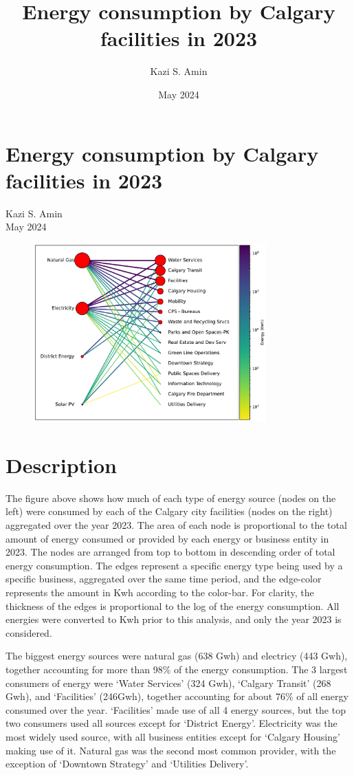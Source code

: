 \documentclass{article}
\title{Energy consumption by Calgary facilities in 2023}
\author{Kazi S. Amin}
\date{May 2024}
\begin{document}
{\centering\section*{Energy consumption by Calgary facilities in 2023}
Kazi S. Amin\\
May 2024\\
}
\begin{figure}
    \centering
    \includegraphics[width=0.8\textwidth]{Data_Analytics_Summer_Position/graph.pdf}
    \label{fig:enter-label}
\end{figure}

\FloatBarrier
\section*{Description}

The figure above shows how much of each type of energy source (nodes on the left) were consumed by each of the Calgary city facilities (nodes on the right) aggregated over the year 2023. The area of each node is proportional to the total amount of energy consumed or provided by each energy or business entity in 2023. The nodes are arranged from top to bottom in descending order of total energy consumption. The edges represent a specific energy type being used by a specific business, aggregated over the same time period, and the edge-color represents the amount in Kwh according to the color-bar. For clarity, the thickness of the edges is proportional to the log of the energy consumption. All energies were converted to Kwh prior to this analysis, and only the year 2023 is considered.

The biggest energy sources were natural gas (638 Gwh) and electricy (443 Gwh), together accounting for more than 98\% of the energy consumption. The 3 largest consumers of energy were `Water Services' (324 Gwh), `Calgary Transit' (268 Gwh), and `Facilities' (246Gwh), together accounting for about 76\% of all energy consumed over the year. `Facilities' made use of all 4 energy sources, but the top two consumers used all sources except for `District Energy'. Electricity was the most widely used source, with all business entities except for `Calgary Housing' making use of it. Natural gas was the second most common provider, with the exception of `Downtown Strategy' and `Utilities Delivery'.
\end{document}
